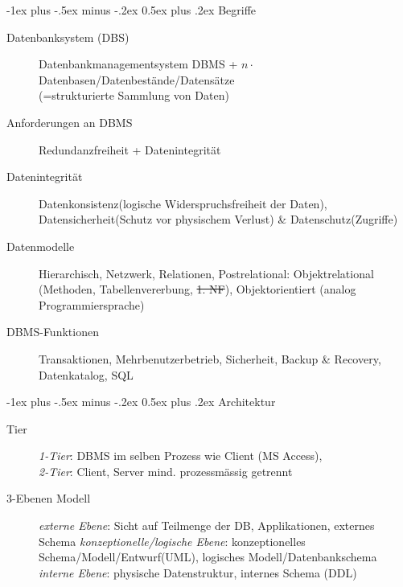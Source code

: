 \documentclass[10pt,landscape,a4paper]{article}
\makeatletter
\renewcommand{\section}{\@startsection{section}{1}{0mm}%
                                {-1ex plus -.5ex minus -.2ex}%
                                {0.5ex plus .2ex}%
                                {\normalfont\large\bfseries}}
\makeatother
\begin{document}
\footnotesize
\begin{multicols*}{3}


\setlength{\premulticols}{1pt}
\setlength{\postmulticols}{1pt}
\setlength{\multicolsep}{1pt}
\setlength{\columnsep}{2pt}

\section{Begriffe}

\begin{description}
\item[Datenbanksystem (DBS)]{Datenbankmanagementsystem DBMS + $n \cdot$ Datenbasen/Datenbestände/Datensätze\\(=strukturierte Sammlung von Daten)}
\item[Anforderungen an DBMS]{Redundanzfreiheit + Datenintegrität}
\item[Datenintegrität]{Datenkonsistenz(logische Widerspruchsfreiheit der Daten), Datensicherheit(Schutz vor physischem Verlust) \& Datenschutz(Zugriffe)}
\item[Datenmodelle]{Hierarchisch, Netzwerk, Relationen, Postrelational: Objektrelational (Methoden, Tabellenvererbung,
    \sout{1. NF}), Objektorientiert (analog Programmiersprache)}
\item[DBMS-Funktionen]Transaktionen, Mehrbenutzerbetrieb, Sicherheit, Backup \& Recovery, Datenkatalog, SQL
\end{description}
\section{Architektur}

\begin{description}
\item[Tier]{\textit{1-Tier}: DBMS im selben Prozess wie Client (MS Access),\\ 
\textit{2-Tier}:
    Client, Server mind. prozessmässig getrennt}

\item[3-Ebenen Modell]\textit{externe Ebene}: Sicht auf Teilmenge der DB, Applikationen, externes Schema
\textit{konzeptionelle/logische Ebene}: konzeptionelles Schema/Modell/Entwurf(UML), logisches Modell/Datenbankschema
\textit{interne Ebene}: physische Datenstruktur, internes Schema (DDL)
\end{description}

\end{multicols*}
\end{document}
